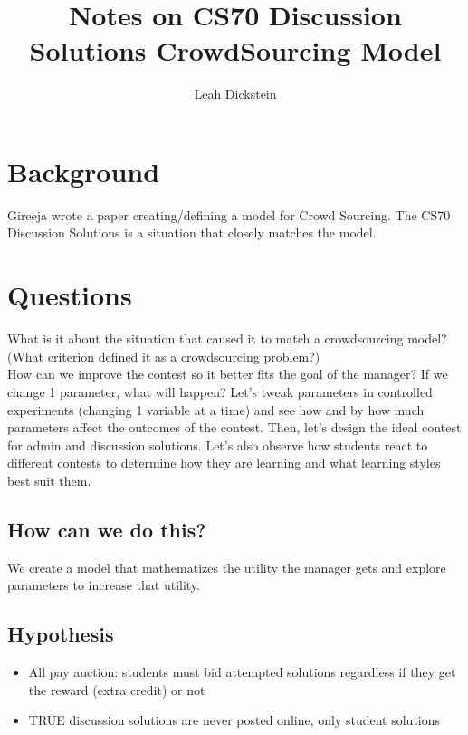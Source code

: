 \documentclass[leqno]{article}
\begin{document}
\title{Notes on CS70 Discussion Solutions CrowdSourcing Model}
\author{Leah Dickstein}

\maketitle

\section{Background}
Gireeja wrote a paper creating/defining a model for Crowd Sourcing. The CS70 Discussion Solutions is a situation that closely matches the model.\\

\section{Questions}
What is it about the situation that caused it to match a crowdsourcing model? (What criterion defined it as a crowdsourcing problem?)\\
How can we improve the contest so it better fits the goal of the manager? If we change 1 parameter, what will happen? Let's tweak parameters in controlled experiments (changing 1 variable at a time) and see how and by how much parameters affect the outcomes of the contest. Then, let's design the ideal contest for admin and discussion solutions. Let's also observe how students react to different contests to determine how they are learning and what learning styles best suit them.\\

\subsection{How can we do this?}
We create a model that mathematizes the utility the manager gets and explore parameters to increase that utility. \\

\subsection{Hypothesis}
\begin{itemize}
\item All pay auction: students must bid attempted solutions regardless if they get the reward (extra credit) or not
\item TRUE discussion solutions are never posted online, only student solutions 
\end{itemize}
\end{document}
